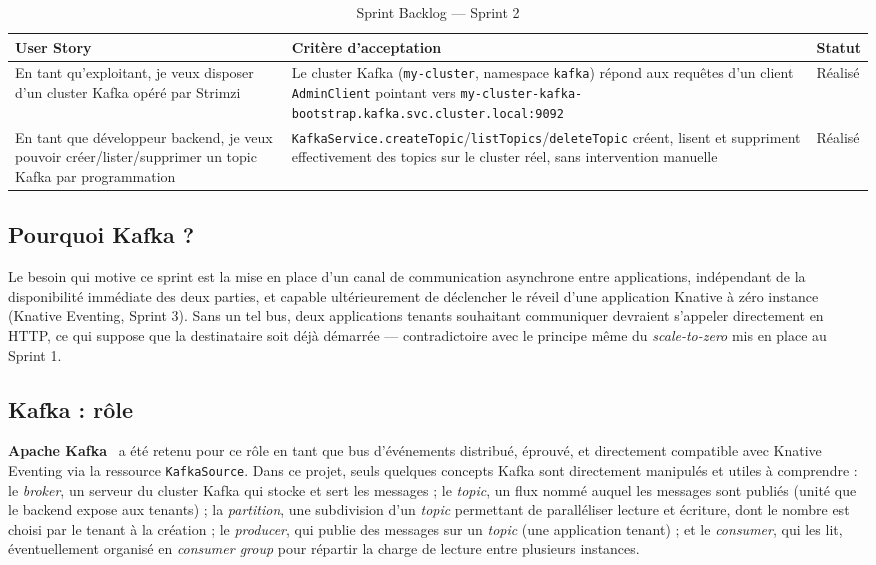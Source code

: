 \begin{table}[!ht]
\begin{center}
     \begin{tabular}{|l{6cm}|l{5.5cm}|l{2.5cm}|}
     \hline
     \textbf{User Story} & \textbf{Critère d'acceptation} & \textbf{Statut} \\
     \hline
     En tant qu'exploitant, je veux disposer d'un cluster Kafka opéré par Strimzi & Le cluster Kafka (\texttt{my-cluster}, namespace \texttt{kafka}) répond aux requêtes d'un client \texttt{AdminClient} pointant vers \texttt{my-cluster-kafka-bootstrap.kafka.svc.cluster.local:9092} & Réalisé \\
     \hline
     En tant que développeur backend, je veux pouvoir créer/lister/supprimer un topic Kafka par programmation & \texttt{KafkaService.createTopic}/\texttt{listTopics}/\texttt{deleteTopic} créent, lisent et suppriment effectivement des topics sur le cluster réel, sans intervention manuelle & Réalisé \\
     \hline
     \end{tabular}
     \caption{Sprint Backlog — Sprint 2}
     \label{tab:sb-sprint2}
     \end{center}
\end{table}

\subsection{Pourquoi Kafka ?}

Le besoin qui motive ce sprint est la mise en place d'un canal de communication asynchrone entre applications, indépendant de la disponibilité immédiate des deux parties, et capable ultérieurement de déclencher le réveil d'une application Knative à zéro instance (Knative Eventing, Sprint 3). Sans un tel bus, deux applications tenants souhaitant communiquer devraient s'appeler directement en HTTP, ce qui suppose que la destinataire soit déjà démarrée — contradictoire avec le principe même du \textit{scale-to-zero} mis en place au Sprint 1.

\subsection{Kafka : rôle}

\textbf{Apache Kafka}~\citep{KafkaDoc} a été retenu pour ce rôle en tant que bus d'événements distribué, éprouvé, et directement compatible avec Knative Eventing via la ressource \texttt{KafkaSource}. Dans ce projet, seuls quelques concepts Kafka sont directement manipulés et utiles à comprendre : le \textit{broker}, un serveur du cluster Kafka qui stocke et sert les messages ; le \textit{topic}, un flux nommé auquel les messages sont publiés (unité que le backend expose aux tenants) ; la \textit{partition}, une subdivision d'un \textit{topic} permettant de paralléliser lecture et écriture, dont le nombre est choisi par le tenant à la création ; le \textit{producer}, qui publie des messages sur un \textit{topic} (une application tenant) ; et le \textit{consumer}, qui les lit, éventuellement organisé en \textit{consumer group} pour répartir la charge de lecture entre plusieurs instances.

